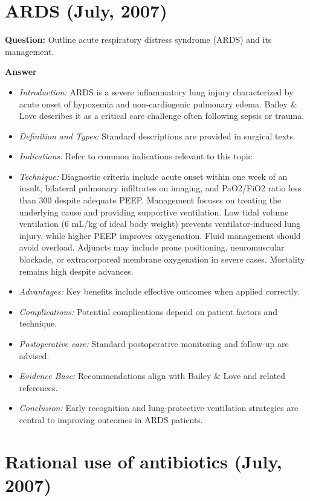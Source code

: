 \documentclass{article}
\begin{document}
\section{ARDS (July, 2007)}

\textbf{Question:} Outline acute respiratory distress syndrome (ARDS) and its management.

\textbf{Answer}
\begin{itemize}

\item \emph{Introduction:} ARDS is a severe inflammatory lung injury characterized by acute onset of hypoxemia and non-cardiogenic pulmonary edema. Bailey \& Love describes it as a critical care challenge often following sepsis or trauma.
\item \emph{Definition and Types:} Standard descriptions are provided in surgical texts.
\item \emph{Indications:} Refer to common indications relevant to this topic.

\item \emph{Technique:} Diagnostic criteria include acute onset within one week of an insult, bilateral pulmonary infiltrates on imaging, and PaO2/FiO2 ratio less than 300 despite adequate PEEP. Management focuses on treating the underlying cause and providing supportive ventilation. Low tidal volume ventilation (6 mL/kg of ideal body weight) prevents ventilator-induced lung injury, while higher PEEP improves oxygenation. Fluid management should avoid overload. Adjuncts may include prone positioning, neuromuscular blockade, or extracorporeal membrane oxygenation in severe cases. Mortality remains high despite advances.
\item \emph{Advantages:} Key benefits include effective outcomes when applied correctly.
\item \emph{Complications:} Potential complications depend on patient factors and technique.
\item \emph{Postoperative care:} Standard postoperative monitoring and follow-up are advised.
\item \emph{Evidence Base:} Recommendations align with Bailey \& Love and related references.

\item \emph{Conclusion:} Early recognition and lung-protective ventilation strategies are central to improving outcomes in ARDS patients.


\end{itemize}

\section{Rational use of antibiotics (July, 2007)}
\end{document}
